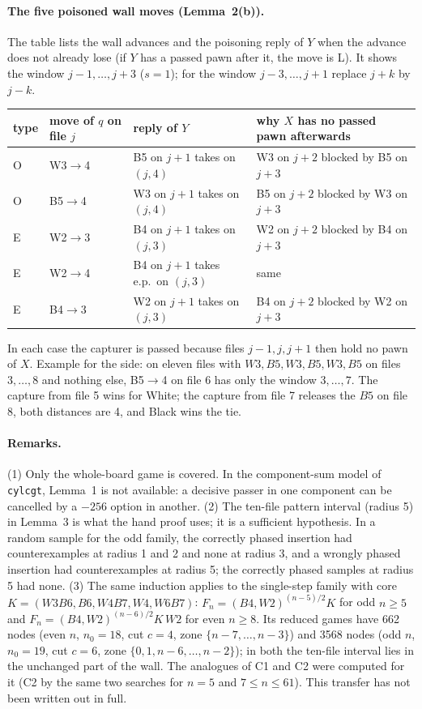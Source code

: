 \paragraph{The five poisoned wall moves (Lemma~2(b)).}
The table lists the wall advances and the poisoning reply of $Y$ when the advance does not already lose (if $Y$ has a passed pawn after
it, the move is L). It shows the window $j-1,\dots,j+3$ ($s=1$); for the window $j-3,\dots,j+1$ replace $j+k$ by $j-k$.
\begin{center}\small
\begin{tabular}{llll}
type & move of $q$ on file $j$ & reply of $Y$ & why $X$ has no passed pawn afterwards\\\hline
O & W3$\to$4 & B5 on $j{+}1$ takes on $(j,4)$ & W3 on $j{+}2$ blocked by B5 on $j{+}3$\\
O & B5$\to$4 & W3 on $j{+}1$ takes on $(j,4)$ & B5 on $j{+}2$ blocked by W3 on $j{+}3$\\
E & W2$\to$3 & B4 on $j{+}1$ takes on $(j,3)$ & W2 on $j{+}2$ blocked by B4 on $j{+}3$\\
E & W2$\to$4 & B4 on $j{+}1$ takes e.p.\ on $(j,3)$ & same\\
E & B4$\to$3 & W2 on $j{+}1$ takes on $(j,3)$ & B4 on $j{+}2$ blocked by W2 on $j{+}3$\\
\end{tabular}
\end{center}
In each case the capturer is passed because files $j-1,j,j+1$ then hold no pawn of $X$. Example for the side: on eleven files with
$W3,B5,W3,B5,W3,B5$ on files $3,\dots,8$ and nothing else, B5$\to$4 on file 6 has only the window $3,\dots,7$. The capture from file 5
wins for White; the capture from file 7 releases the $B5$ on file 8, both distances are 4, and Black wins the tie.

\paragraph{Remarks.}
(1) Only the whole-board game is covered. In the component-sum model of \texttt{cylcgt}, Lemma~1 is not available: a decisive passer in one
component can be cancelled by a $-256$ option in another.
(2) The ten-file pattern interval (radius 5) in Lemma~3 is what the hand proof uses; it is a sufficient hypothesis. In a random sample
for the odd family, the correctly phased insertion had counterexamples at radius 1 and 2 and none at radius 3, and a wrongly phased
insertion had counterexamples at radius 5; the correctly phased samples at radius 5 had none.
(3) The same induction applies to the single-step family with core $K=(W3B6,B6,W4B7,W4,W6B7)$: $F_n=(B4,W2)^{(n-5)/2}K$ for odd
$n\ge5$ and $F_n=(B4,W2)^{(n-6)/2}K\,W2$ for even $n\ge8$. Its reduced games have 662 nodes (even $n$, $n_0=18$, cut $c=4$, zone
$\{n-7,\dots,n-3\}$) and 3568 nodes (odd $n$, $n_0=19$, cut $c=6$, zone $\{0,1,n-6,\dots,n-2\}$); in both the ten-file interval lies in the
unchanged part of the wall. The analogues of C1 and C2 were computed for it (C2 by the same two searches for $n=5$ and $7\le n\le61$).
This transfer has not been written out in full.

